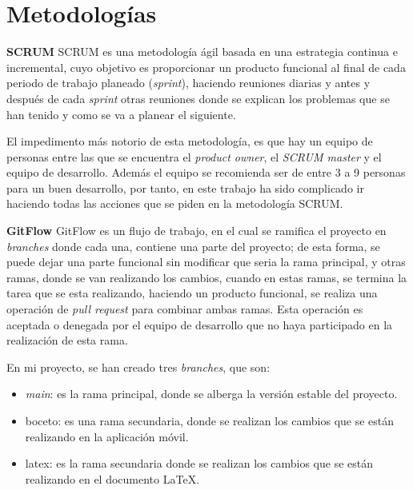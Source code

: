 
\section{Metodologías}
\textbf{SCRUM}\newline
 SCRUM es una metodología ágil basada en una estrategia continua e incremental, cuyo objetivo es proporcionar un producto funcional al final de cada periodo de trabajo planeado (\textit{sprint}), haciendo reuniones diarias y antes y después de cada \textit{sprint} otras reuniones donde se explican los problemas que se han tenido y como se va a planear el siguiente.

El impedimento más notorio de esta metodología, es que hay un equipo de personas entre las que se encuentra el \textit{product owner}, el \textit{SCRUM master} y el equipo de desarrollo. Además el equipo se recomienda ser de entre 3 a 9 personas para un buen desarrollo, por tanto, en este trabajo ha sido complicado ir haciendo todas las acciones que se piden en la metodología SCRUM.

\textbf{GitFlow}\newline
GitFlow es un flujo de trabajo, en el cual se ramifica el proyecto en \textit{branches} donde cada una, contiene una parte del proyecto; de esta forma, se puede dejar una parte funcional sin modificar que seria la rama principal, y otras ramas, donde se van realizando los cambios, cuando en estas ramas, se termina la tarea que se esta realizando, haciendo un producto funcional, se realiza una operación de \textit{pull request} para combinar ambas ramas. Esta operación es aceptada o denegada por el equipo de desarrollo que no haya participado en la realización de esta rama.

En mi proyecto, se han creado tres \textit{branches}, que son:
\begin{itemize}
    \item \textit{main}: es la rama principal, donde se alberga la versión estable del proyecto.
    \item boceto: es una rama secundaria, donde se realizan los cambios que se están realizando en la aplicación móvil.
    \item latex: es la rama secundaria donde se realizan los cambios que se están realizando en el documento LaTeX.
\end{itemize}




